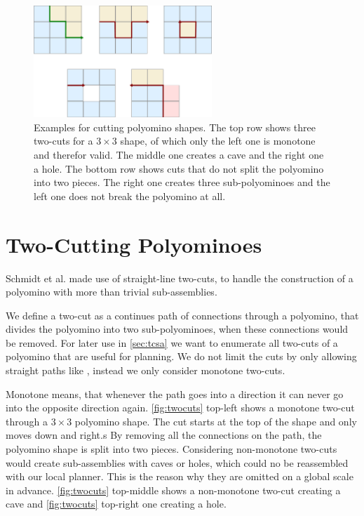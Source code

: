 \begin{figure}
	\centering
	\includegraphics[width=0.6\textwidth]{figures/twocuts.pdf}
	\caption[Different cuts for polyomino shapes]{Examples for cutting polyomino shapes. The top row shows three two-cuts for a $3\times3$ shape, of which only the left one is monotone and therefor valid. The middle one creates a cave and the right one a hole. The bottom row shows cuts that do not split the polyomino into two pieces. The right one creates three sub-polyominoes and the left one does not break the polyomino at all.}
	\label{fig:twocuts}
\end{figure}

\section{Two-Cutting Polyominoes}
\label{sec:twocutting}

Schmidt et al. \cite{Schmidt2018} made use of straight-line two-cuts, to handle the construction of a polyomino with more than trivial sub-assemblies.

We define a two-cut as a continues path of connections through a polyomino, that divides the polyomino into two sub-polyominoes, when these connections would be removed.
For later use in \autoref{sec:tcsa} we want to enumerate all two-cuts of a polyomino that are useful for planning.
We do not limit the cuts by only allowing straight paths like \cite{Schmidt2018}, instead we only consider monotone two-cuts.

Monotone means, that whenever the path goes into a direction it can never go into the opposite direction again.
\autoref{fig:twocuts} top-left shows a monotone two-cut through a $3\times3$ polyomino shape.
The cut starts at the top of the shape and only moves down and right.s
By removing all the connections on the path, the polyomino shape is split into two pieces.
Considering non-monotone two-cuts would create sub-assemblies with caves or holes, which could no be reassembled with our local planner.
This is the reason why they are omitted on a global scale in advance.
\autoref{fig:twocuts} top-middle shows a non-monotone two-cut creating a cave and \autoref{fig:twocuts} top-right one creating a hole.


